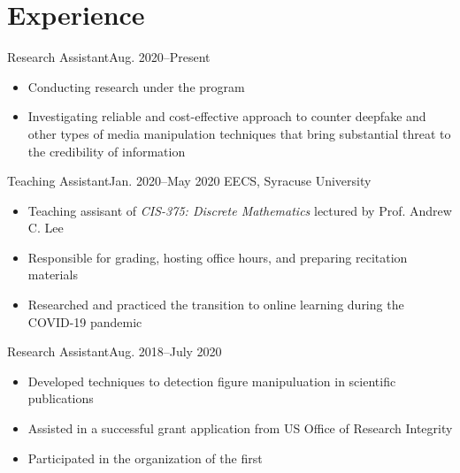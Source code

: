 \documentclass[letterpaper, 11pt]{article}
\begin{document}
\section{Experience}


\begin{itemize}

\begin{itemntl}{Research Assistant}{Aug. 2020--Present}
{}

\begin{itemize}
\item Conducting research under the  program
\item Investigating reliable and cost-effective approach to counter deepfake and other types of media manipulation techniques that bring substantial threat to the credibility of information
\end{itemize}
\end{itemntl}

\begin{itemntl}{Teaching Assistant}{Jan. 2020--May 2020}
{EECS, Syracuse University}

\begin{itemize}
\item Teaching assisant of \textit{CIS-375: Discrete Mathematics} lectured by Prof. Andrew C. Lee
\item Responsible for grading, hosting office hours, and preparing recitation materials
\item Researched and practiced the transition to online learning during the COVID-19 pandemic
\end{itemize}
\end{itemntl}

\begin{itemntl}{Research Assistant}{Aug. 2018--July 2020}
{}
\begin{itemize}
\item Developed techniques to detection figure manipuluation in scientific publications
\item Assisted in a successful grant application from US Office of Research Integrity
\item Participated in the organization of the first 
\end{itemize}

\end{itemntl}

\end{itemize}
\end{document}
